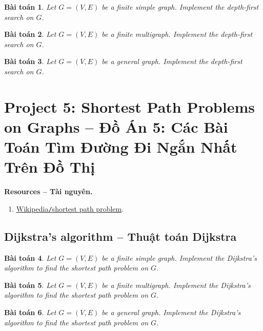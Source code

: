 \documentclass{article}
\newtheorem{baitoan}{Bài toán}
\begin{document}
\begin{baitoan}
    Let $G = (V,E)$ be a finite simple graph. Implement the depth-first search on $G$.
\end{baitoan}

\begin{baitoan}
    Let $G = (V,E)$ be a finite multigraph. Implement the depth-first search on $G$.
\end{baitoan}

\begin{baitoan}
    Let $G = (V,E)$ be a general graph. Implement the depth-first search on $G$.
\end{baitoan}


\section{Project 5: Shortest Path Problems on Graphs -- Đồ Án 5: Các Bài Toán Tìm Đường Đi Ngắn Nhất Trên Đồ Thị}
\textbf{\textsf{Resources -- Tài nguyên.}}
\begin{enumerate}
    \item \href{https://en.wikipedia.org/wiki/Shortest_path_problem}{Wikipedia{\tt/}shortest path problem}.
\end{enumerate}


\subsection{Dijkstra's algorithm -- Thuật toán Dijkstra}

\begin{baitoan}
    Let $G = (V,E)$ be a finite simple graph. Implement the Dijkstra's algorithm to find the shortest path problem on $G$.
\end{baitoan}

\begin{baitoan}
    Let $G = (V,E)$ be a finite multigraph. Implement the Dijkstra's algorithm to find the shortest path problem on $G$.
\end{baitoan}

\begin{baitoan}
    Let $G = (V,E)$ be a general graph. Implement the Dijkstra's algorithm to find the shortest path problem on $G$.
\end{baitoan}
\end{document}
